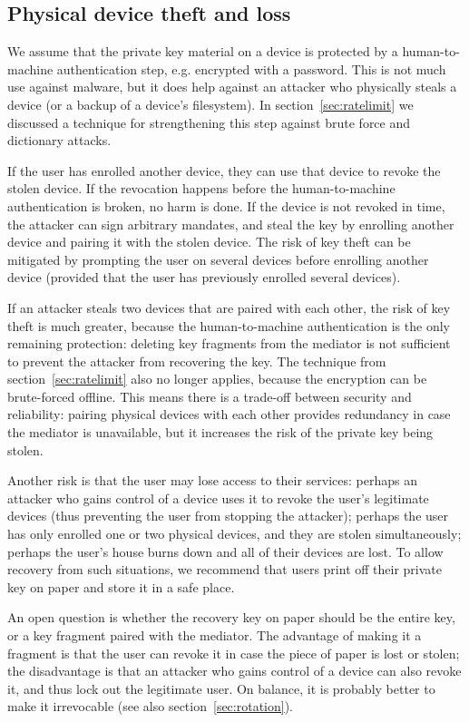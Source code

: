 \subsection{Physical device theft and loss}\label{sec:theftloss}

We assume that the private key material on a device is protected by a human-to-machine
authentication step, e.g. encrypted with a password. This is not much use against malware, but it
does help against an attacker who physically steals a device (or a backup of a device's filesystem).
In section~\ref{sec:ratelimit} we discussed a technique for strengthening this step against brute
force and dictionary attacks.

If the user has enrolled another device, they can use that device to revoke the stolen device. If
the revocation happens before the human-to-machine authentication is broken, no harm is done. If the
device is not revoked in time, the attacker can sign arbitrary mandates, and steal the key by
enrolling another device and pairing it with the stolen device. The risk of key theft can be
mitigated by prompting the user on several devices before enrolling another device (provided that
the user has previously enrolled several devices).

If an attacker steals two devices that are paired with each other, the risk of key theft is much
greater, because the human-to-machine authentication is the only remaining protection: deleting key
fragments from the mediator is not sufficient to prevent the attacker from recovering the key.  The
technique from section~\ref{sec:ratelimit} also no longer applies, because the encryption can be
brute-forced offline. This means there is a trade-off between security and reliability: pairing
physical devices with each other provides redundancy in case the mediator is unavailable, but it
increases the risk of the private key being stolen.

Another risk is that the user may lose access to their services: perhaps an attacker who gains
control of a device uses it to revoke the user's legitimate devices (thus preventing the user from
stopping the attacker); perhaps the user has only enrolled one or two physical devices, and they are
stolen simultaneously; perhaps the user's house burns down and all of their devices are lost. To
allow recovery from such situations, we recommend that users print off their private key on paper
and store it in a safe place.

An open question is whether the recovery key on paper should be the entire key, or a key fragment
paired with the mediator. The advantage of making it a fragment is that the user can revoke it in
case the piece of paper is lost or stolen; the disadvantage is that an attacker who gains control of
a device can also revoke it, and thus lock out the legitimate user. On balance, it is probably
better to make it irrevocable (see also section~\ref{sec:rotation}).

